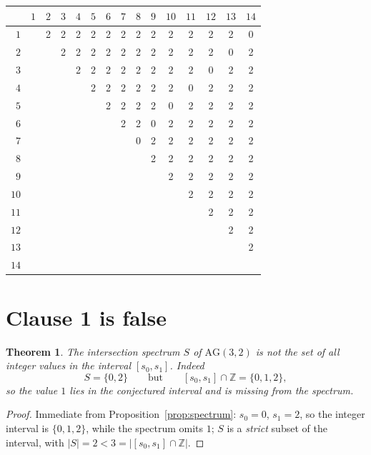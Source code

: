 \documentclass[11pt]{article}
\newtheorem{theorem}{Theorem}
\theoremstyle{definition}
\theoremstyle{remark}
\newcommand{\AG}{\mathrm{AG}}
\begin{document}
\begin{center}
\footnotesize
\setlength{\tabcolsep}{4pt}
\begin{tabular}{r|*{14}{c}}
\multicolumn{1}{c}{} & $1$ & $2$ & $3$ & $4$ & $5$ & $6$ & $7$ & $8$ & $9$ & $10$ & $11$ & $12$ & $13$ & $14$ \\
\hline
$1$  & & 2 & 2 & 2 & 2 & 2 & 2 & 2 & 2 & 2 & 2 & 2 & 2 & 0 \\
$2$  & & & 2 & 2 & 2 & 2 & 2 & 2 & 2 & 2 & 2 & 2 & 0 & 2 \\
$3$  & & & & 2 & 2 & 2 & 2 & 2 & 2 & 2 & 2 & 0 & 2 & 2 \\
$4$  & & & & & 2 & 2 & 2 & 2 & 2 & 2 & 0 & 2 & 2 & 2 \\
$5$  & & & & & & 2 & 2 & 2 & 2 & 0 & 2 & 2 & 2 & 2 \\
$6$  & & & & & & & 2 & 2 & 0 & 2 & 2 & 2 & 2 & 2 \\
$7$  & & & & & & & & 0 & 2 & 2 & 2 & 2 & 2 & 2 \\
$8$  & & & & & & & & & 2 & 2 & 2 & 2 & 2 & 2 \\
$9$  & & & & & & & & & & 2 & 2 & 2 & 2 & 2 \\
$10$ & & & & & & & & & & & 2 & 2 & 2 & 2 \\
$11$ & & & & & & & & & & & & 2 & 2 & 2 \\
$12$ & & & & & & & & & & & & & 2 & 2 \\
$13$ & & & & & & & & & & & & & & 2 \\
$14$ & & & & & & & & & & & & & & \\
\end{tabular}
\end{center}

\section{Clause 1 is false}

\begin{theorem}\label{thm:clause1}
The intersection spectrum $S$ of $\AG(3,2)$ is \emph{not} the set of all
integer values in the interval $[s_0,s_1]$. Indeed
\[
S = \{0,2\}
\qquad\text{but}\qquad
[s_0,s_1] \cap \mathbb{Z} = \{0,1,2\},
\]
so the value $1$ lies in the conjectured interval and is missing from the
spectrum.
\end{theorem}

\begin{proof}
Immediate from Proposition~\ref{prop:spectrum}: $s_0 = 0$, $s_1 = 2$, so the
integer interval is $\{0,1,2\}$, while the spectrum omits $1$; $S$ is a
\emph{strict} subset of the interval, with $|S| = 2 < 3 = |[s_0,s_1]\cap
\mathbb{Z}|$.
\end{proof}
\end{document}
